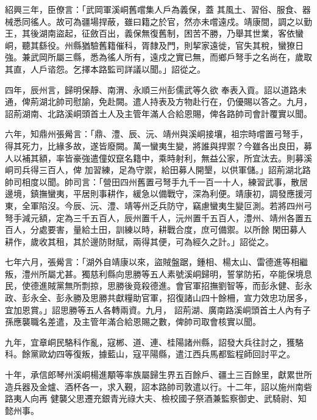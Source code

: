 
\begin{pinyinscope}

 紹興三年，臣僚言：「武岡軍溪峒舊嚐集人戶為義保，蓋
 其風土、習俗、服食、器械悉同徭人。故可為疆場捍蔽，雖曰籍之於官，然亦未嚐遠戍。靖康間，調之以勤王，其後湖南盜起，征斂百出，義保無復舊制，困苦不勝，乃舉其世業，客依蠻峒，聽其繇役。州縣猶驗舊籍催科，胥隸及門，則挈家遠徙，官失其稅，蠻獠日強。兼武岡所屬三縣，悉為徭人所有，遠戍之實已無，而鄉戶弩手之名尚在，歲取其直，人戶谘怨。乞擇本路監司詳議以聞。」詔從之。



 四年，辰州言，歸明保靜、南渭、永順三州彭儒武等久欲
 奉表入貢。詔以道路未通，俾荊湖北帥司慰諭，免赴闕。遣人持表及方物赴行在，仍優賜以答之。九月，詔荊湖南、北路溪峒頭首土人及主管年滿人合給恩賜，俾各路帥司會計覆實以聞。



 六年，知鼎州張觷言：「鼎、澧、辰、沅、靖州與溪峒接壤，祖宗時嚐置弓弩手，得其死力，比緣多故，遂皆廢闕。萬一蠻夷生變，將誰與捍禦？今雖各出良田，募人以補其額，率皆豪強遣僮奴竄名籍中，乘時射利，無益公家，所宜汰去。則募溪峒司兵得三百人，俾
 加習練，足為守禦，給田募人開墾，以供軍儲。」詔荊湖北路帥司相度以聞。帥司言：「營田四州舊置弓弩手九千一百一十人，練習武事，散居邊境，鎮撫蠻夷，平居則事耕作，緩急以備戰守，深為利便。靖康初，調發應援河東，全軍陷沒。今辰、沅、澧、靖等州乏兵防守，竊慮蠻夷生變叵測。若將四州弓弩手減元額，定為三千五百人，辰州置千人，沅州置千五百人，澧州、靖州各置五百人，分處要害，量給土田，訓練以時，耕戰合度，庶可備禦。以所餘
 閑田募人耕作，歲收其租，其於邊防財賦，兩得其便，可為經久之計。」詔從之。



 七年六月，張觷言：「湖外自靖康以來，盜賊盤踞，鍾相、楊太山、雷德進等相繼叛，澧州所屬尤甚。獨慈利縣向思勝等五人素號溪峒歸明，誓掌防拓，卒能保境息民，使德進賊黨無所剽掠，思勝後竟殺德進。會官軍招撫劉智等，而彭永健、彭永政、彭永全、彭永勝及思勝共獻糧助官軍，招復諸山四十餘柵，宣力效忠功居多，宜加恩賞。」詔思勝等五人各轉兩資。九月，
 詔荊湖、廣南路溪峒頭首土人內有子孫應襲職名差遣，及主管年滿合給恩賜之數，俾帥司取會核實以聞。



 九年，宜章峒民駱科作亂，寇郴、道、連、桂陽諸州縣，詔發大兵往討之，獲駱科。餘黨歐幼四等復叛，據藍山，寇平陽縣，遣江西兵馬都監程師回討平之。



 十年，承信郎琴州溪峒楊進顒等率族屬歸生界五百餘戶、疆土三百餘里，獻累世所造兵器及金爐、酒杯各一，求入覲，詔本路帥司敦遣以行。十二年，詔以施州南砦路夷人向再
 健襲父思遷充銀青光祿大夫、檢校國子祭酒兼監察御史、武騎尉、知懿州事。




\end{pinyinscope}
